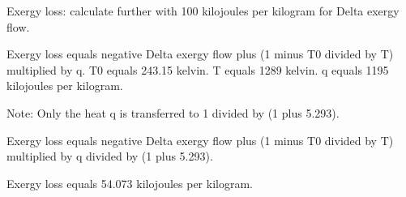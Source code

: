 Exergy loss: calculate further with 100 kilojoules per kilogram for Delta exergy flow.  

Exergy loss equals negative Delta exergy flow plus (1 minus T0 divided by T) multiplied by q.  
T0 equals 243.15 kelvin.  
T equals 1289 kelvin.  
q equals 1195 kilojoules per kilogram.  

Note: Only the heat q is transferred to 1 divided by (1 plus 5.293).  

Exergy loss equals negative Delta exergy flow plus (1 minus T0 divided by T) multiplied by q divided by (1 plus 5.293).  

Exergy loss equals 54.073 kilojoules per kilogram.